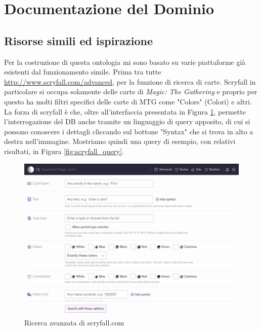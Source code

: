 \documentclass[12pt]{article}
\begin{document}
\section{Documentazione del Dominio}
\subsection{Risorse simili ed ispirazione}

Per la costruzione di questa ontologia mi sono basato su varie piattaforme già esistenti dal funzionamento simile. Prima tra tutte \url{http://www.scryfall.com/advanced}, per la funzione di ricerca di carte. Scryfall in particolare si occupa solamente delle carte di \textit{Magic: The Gathering} e proprio per questo ha molti filtri specifici delle carte di MTG come "Colors" (Colori) e altri. La forza di scryfall è che, oltre all'interfaccia presentata in Figura \ref{fig:scryfall}, permette l'interrogazione del DB anche tramite un linguaggio di query apposito, di cui si possono conoscere i dettagli cliccando sul bottone "Syntax" che si trova in alto a destra nell'immagine. Mostriamo quindi una query di esempio, con relativi risultati, in Figura \ref{fig:scryfall_query}.

\begin{figure}[H]
    \centering
         \includegraphics[width=14cm]{files/scryfall_advanced.png}
    \caption{Ricerca avanzata di scryfall.com}
    \label{fig:scryfall}
\end{figure}
\end{document}
